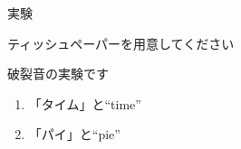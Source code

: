 \documentclass[aspectratio=169,xcolor={dvipsnames,table}]{beamer}
\begin{document}
\begin{frame}[plain]{実験}
 \large

ティッシュペーパーを用意してください\pause

\bigskip

破裂音の実験です\pause

\bigskip

\begin{enumerate}
 \item 「タイム」と``time''\hspace{30pt}\pause
 \item 「パイ」と``pie''\hspace{49pt}
\end{enumerate}

\hfill{\scriptsize {}}

\end{frame}
\end{document}
